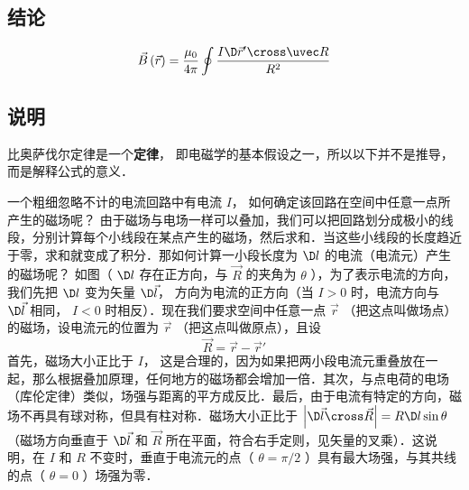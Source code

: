 \subsection{结论}
\begin{equation}
\vec B\left( {\vec r} \right) = \frac{{{\mu _0}}}{{4\pi }}\oint {\frac{{I\D \vec r' \cross \uvec R}}{{{R^2}}}} 
\end{equation}
\subsection{说明}
比奥萨伐尔定律是一个\textbf{定律}， 即电磁学的基本假设之一，所以以下并不是推导，而是解释公式的意义．

一个粗细忽略不计的电流回路中有电流 $I$， 如何确定该回路在空间中任意一点所产生的磁场呢？ 由于磁场与电场一样可以叠加，我们可以把回路划分成极小的线段，分别计算每个小线段在某点产生的磁场，然后求和．当这些小线段的长度趋近于零，求和就变成了积分．那如何计算一小段长度为 $\D l$ 的电流（电流元）产生的磁场呢？ 如图（%
 $\D l$ 存在正方向，与 $\vec R$ 的夹角为 $\theta $ ），为了表示电流的方向，我们先把 $\D l$ 变为矢量 $\D \vec l$， 方向为电流的正方向（当 $I > 0$ 时，电流方向与 $\D \vec l$ 相同， $I < 0$ 时相反）．现在我们要求空间中任意一点 $\vec r$ （把这点叫做场点）的磁场，设电流元的位置为 $\vec r$ （把这点叫做原点），且设
\begin{equation}
\vec R = \vec r - \vec r'
\end{equation}
首先，磁场大小正比于 $I$， 这是合理的，因为如果把两小段电流元重叠放在一起，那么根据叠加原理，任何地方的磁场都会增加一倍．其次，与点电荷的电场（库伦定律）类似，场强与距离的平方成反比．最后，由于电流有特定的方向，磁场不再具有球对称，但具有柱对称．磁场大小正比于 $\left| {\D \vec l \cross \vec R} \right| = R \D l \sin \theta $ （磁场方向垂直于 $\D \vec l$ 和 $\vec R$ 所在平面，符合右手定则，见矢量的叉乘）．这说明，在 $I$ 和 $R$ 不变时，垂直于电流元的点（ $\theta  = \pi /2$ ）具有最大场强，与其共线的点（ $\theta  = 0$ ）场强为零．

